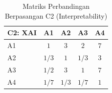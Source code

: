 \begin{table}[H]
	\centering
	\caption{Matriks Perbandingan Berpasangan C2 (Interpretability)}
	\label{tab:perbandingan_c2}
	\begin{tabular}{|l|c|c|c|c|}
		\hline
		C2: XAI & A1 & A2 & A3 & A4 \\ \hline
		A1 & $1$ & $3$ & $2$ & $7$ \\ \hline
		A2 & $1/3$ & $1$ & $1/3$ & $3$ \\ \hline
		A3 & $1/2$ & $3$ & $1$ & $7$ \\ \hline
		A4 & $1/7$ & $1/3$ & $1/7$ & $1$ \\ \hline
	\end{tabular}
\end{table}